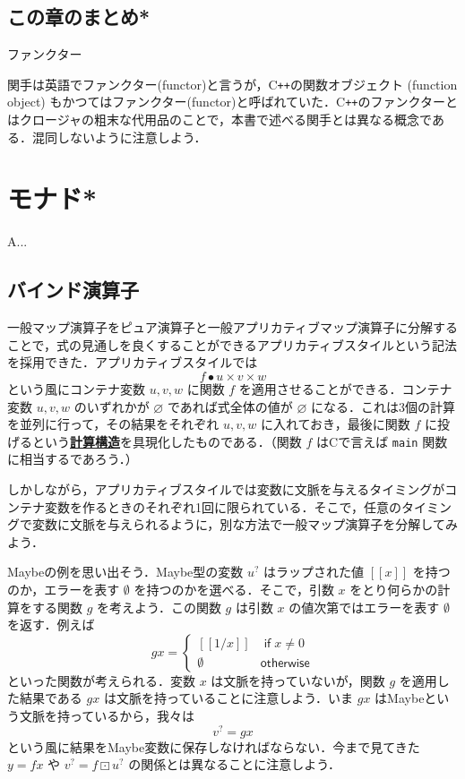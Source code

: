 \documentclass[a4paper,twocolumn]{jsbook}
\def\[{\left[\!\left[}
\def\]{\right]\!\right]}
\newcommand{\programminglanguage}[1]{\textsf{#1}}
\newcommand{\clang}{\programminglanguage{C}}
\newcommand{\cxx}{\programminglanguage{C}\texttt{++}}
\newenvironment{leader}{\begingroup\gt}{\endgroup}
\newenvironment{note}[1]{\begin{boxnote}\begin{center}#1\end{center}}{\end{boxnote}}
\newcommand{\keyword}[1]{{\underline{\textbf{#1}}}}
\newcommand{\code}[1]{\texttt{#1}}
\newcommand{\mKeyword}[1]{\mathsf{#1}} %
\newcommand{\mIfKeyword}{\mKeyword{if}}
\newcommand{\mOtherwiseKeyword}{\mKeyword{otherwise}}
\DeclareMathOperator{\mIf}{\mIfKeyword}
\DeclareMathOperator{\mOtherwise}{\mOtherwiseKeyword}
\newcommand{\mNothing}{\emptyset}
\newcommand{\mPureNothing}{\varnothing}
\DeclareMathOperator{\mAppMap}{\times}
\DeclareMathOperator{\mMap}{\bullet}
\DeclareMathOperator{\mMapMaybe}{\boxdot}
\newcommand{\mMaybeWith}[1]{\[#1\]}
\newcommand{\mMaybe}[1]{{#1}^\text{?}}
\begin{document}
\section{この章のまとめ*}


\begin{note}{ファンクター}
関手は英語でファンクター(functor)と言うが，\cxx の関数オブジェクト (function object) もかつてはファンクター(functor)と呼ばれていた．\cxx のファンクターとはクロージャの粗末な代用品のことで，本書で述べる関手とは異なる概念である．混同しないように注意しよう．
\end{note}



\chapter{モナド*}
\label{ch:monad}

\begin{leader}
A...
\end{leader}


\section{バインド演算子}


一般マップ演算子をピュア演算子と一般アプリカティブマップ演算子に分解することで，式の見通しを良くすることができるアプリカティブスタイルという記法を採用できた．アプリカティブスタイルでは
\begin{equation}
f\mMap u\mAppMap v\mAppMap w
\end{equation}
という風にコンテナ変数 $u,v,w$ に関数 $f$ を適用させることができる．コンテナ変数 $u,v,w$ のいずれかが $\mPureNothing$ であれば式全体の値が $\mPureNothing$ になる．これは3個の計算を並列に行って，その結果をそれぞれ $u,v,w$ に入れておき，最後に関数 $f$ に投げるという\keyword{計算構造}を具現化したものである．（関数 $f$ は\clang で言えば \code{main} 関数に相当するであろう．）

しかしながら，アプリカティブスタイルでは変数に文脈を与えるタイミングがコンテナ変数を作るときのそれぞれ1回に限られている．そこで，任意のタイミングで変数に文脈を与えられるように，別な方法で一般マップ演算子を分解してみよう．

Maybeの例を思い出そう．Maybe型の変数 $\mMaybe{u}$ はラップされた値 $\mMaybeWith{x}$ を持つのか，エラーを表す $\mNothing$ を持つのかを選べる．そこで，引数 $x$ をとり何らかの計算をする関数 $g$ を考えよう．この関数 $g$ は引数 $x$ の値次第ではエラーを表す $\mNothing$ を返す．例えば
\begin{equation}
gx=\begin{cases}
\mMaybeWith{1/x}&\mIf x\neq0\\
\mNothing&\mOtherwise
\end{cases}
\end{equation}
といった関数が考えられる．変数 $x$ は文脈を持っていないが，関数 $g$ を適用した結果である $gx$ は文脈を持っていることに注意しよう．いま $gx$ はMaybeという文脈を持っているから，我々は
\begin{equation}
\mMaybe{v}=gx
\end{equation}
という風に結果をMaybe変数に保存しなければならない．今まで見てきた $y=fx$ や $\mMaybe{v}=f\mMapMaybe\mMaybe{u}$ の関係とは異なることに注意しよう．
\end{document}
